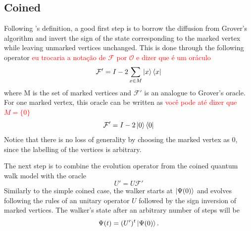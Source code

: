         \subsection{Coined}
                Following \cite{REN1}'s definition, a good first step is to borrow the diffusion from Grover's algorithm and invert the sign of the state corresponding to the marked vertex while leaving unmarked vertices unchanged. This is done through the following operator \textcolor{red}{eu trocaria a notação de $\mathcal{F}$ por $\mathcal{O}$ e dizer que é um oráculo}
                \begin{equation}
                    \mathcal{F'} = I - 2 \sum_{x\in M} \ket{x}\bra{x}
                \end{equation}
                where M is the set of marked vertices and $\mathcal{F'}$ is an analogue to Grover's oracle. For one marked vertex, this oracle can be written as \textcolor{red}{você pode até dizer que $M=\{0\}$}
                \begin{equation}
                    \mathcal{F'} = I - 2 \ket{0}\bra{0}
                \end{equation}
                Notice that there is no loss of generality by choosing the marked vertex as $0$, since the labelling of the vertices is arbitrary.\par
                The next step is to combine the evolution operator from the coined quantum walk model with the oracle
                \begin{equation}
                    U'= U\mathcal{F'}
                    \label{eq:43}
                \end{equation}
                Similarly to the simple coined case, the walker starts at $\ket{\Psi(0)}$ and evolves following the rules of an unitary operator $U$ followed by the sign inversion of marked vertices. The walker's state after an arbitrary number of steps will be
                \begin{equation}
                    \Psi(t) = (U')^t\ket{\Psi(0)}.
                    \label{eq:sysStateSearch}
                \end{equation}\par
    
